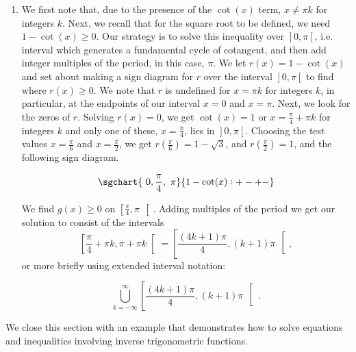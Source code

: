 \begin{example}
\begin{enumerate}
		\item   We first note that, due to the presence of the $\cot(x)$ term, $x \neq \pi k$ for integers $k$.  Next, we recall that for the square root to be defined, we need $1 - \cot(x) \geq 0$.  Our strategy is to solve this inequality over $\left.\right]0,\pi\left[\right.$, i.e. interval which generates a fundamental cycle of cotangent, and then add integer multiples of the period, in this case, $\pi$.  We let $r(x) = 1 - \cot(x)$ and set about making a sign diagram for $r$ over the interval $\left.\right]0,\pi\left[\right.$ to find where $r(x) \geq 0$.  We note that $r$ is undefined for $x = \pi k$ for integers $k$, in particular, at the endpoints of our interval $x = 0$ and $x = \pi$. Next, we look for the zeros of $r$.  Solving $r(x) = 0$, we get $\cot(x) = 1$ or $x = \frac{\pi}{4} + \pi k$ for integers $k$ and only one of these, $x = \frac{\pi}{4}$, lies in $\left.\right]0,\pi\left[\right.$.   Choosing the test values $x = \frac{\pi}{6}$ and $x = \frac{\pi}{2}$, we get $r\left(\frac{\pi}{6}\right) = 1 - \sqrt{3}$, and $r\left(\frac{\pi}{2}\right) = 1$, and the following sign diagram.
		
		$$
		\sgchart{~0, \frac{\pi}{4},~\pi} {1 - \cot(x): +-+-}
		$$
		
		We find $g(x) \geq 0$ on $\left[\frac{\pi}{4}, \pi\, \right[$.  Adding multiples of the period we get our solution to consist of the intervals  $$\left[\frac{\pi}{4} + \pi k, \pi + \pi k  \right[ = \left[\frac{(4k+1)\pi}{4}, (k+1)\pi\, \right[,$$
		or more briefly using extended interval notation:
		
		\[\bigcup_{k = -\infty}^{\infty} \left[\dfrac{(4k+1)\pi}{4}, (k+1)\pi \,\right[\,.\]
		
	\end{enumerate}
	
\end{example}


We close this section with an example that demonstrates how to solve equations and inequalities involving inverse trigonometric functions.

